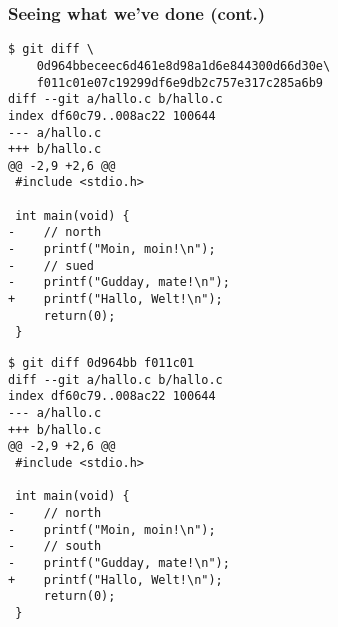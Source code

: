 \begin{frame}[fragile]
\frametitle{Seeing what we've done (cont.)}

\begin{multicols}{2}
\begin{lstlisting}[basicstyle=\tiny\ttfamily\color{black}]
$ git diff \
    0d964bbeceec6d461e8d98a1d6e844300d66d30e\
    f011c01e07c19299df6e9db2c757e317c285a6b9
diff --git a/hallo.c b/hallo.c
index df60c79..008ac22 100644
--- a/hallo.c
+++ b/hallo.c
@@ -2,9 +2,6 @@
 #include <stdio.h>
 
 int main(void) {
-    // north
-    printf("Moin, moin!\n");
-    // sued
-    printf("Gudday, mate!\n");
+    printf("Hallo, Welt!\n");
     return(0);
 }
\end{lstlisting}
\columnbreak
\begin{lstlisting}[basicstyle=\tiny\ttfamily\color{black}]
$ git diff 0d964bb f011c01
diff --git a/hallo.c b/hallo.c
index df60c79..008ac22 100644
--- a/hallo.c
+++ b/hallo.c
@@ -2,9 +2,6 @@
 #include <stdio.h>
 
 int main(void) {
-    // north
-    printf("Moin, moin!\n");
-    // south
-    printf("Gudday, mate!\n");
+    printf("Hallo, Welt!\n");
     return(0);
 }
\end{lstlisting}
\end{multicols}
\end{frame}

